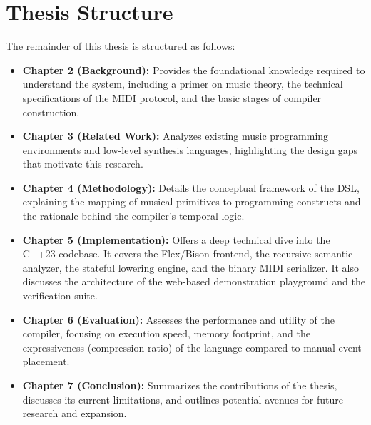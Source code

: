\section{Thesis Structure}

The remainder of this thesis is structured as follows:
\begin{itemize}
  \item \textbf{Chapter 2 (Background):} Provides the foundational knowledge required to understand the
    system, including a primer on music theory, the technical specifications of the MIDI protocol, and the
    basic stages of compiler construction.
  \item \textbf{Chapter 3 (Related Work):} Analyzes existing music programming environments and low-level
    synthesis languages, highlighting the design gaps that motivate this research.
  \item \textbf{Chapter 4 (Methodology):} Details the conceptual framework of the DSL, explaining the mapping
    of musical primitives to programming constructs and the rationale behind the compiler's temporal logic.
  \item \textbf{Chapter 5 (Implementation):} Offers a deep technical dive into the C++23 codebase. It covers
    the Flex/Bison frontend, the recursive semantic analyzer, the stateful lowering engine, and the binary
    MIDI serializer. It also discusses the architecture of the web-based demonstration playground and the
    verification suite.
  \item \textbf{Chapter 6 (Evaluation):} Assesses the performance and utility of the compiler, focusing on
    execution speed, memory footprint, and the expressiveness (compression ratio) of the language compared to
    manual event placement.
  \item \textbf{Chapter 7 (Conclusion):} Summarizes the contributions of the thesis, discusses its current
    limitations, and outlines potential avenues for future research and expansion.
\end{itemize}
